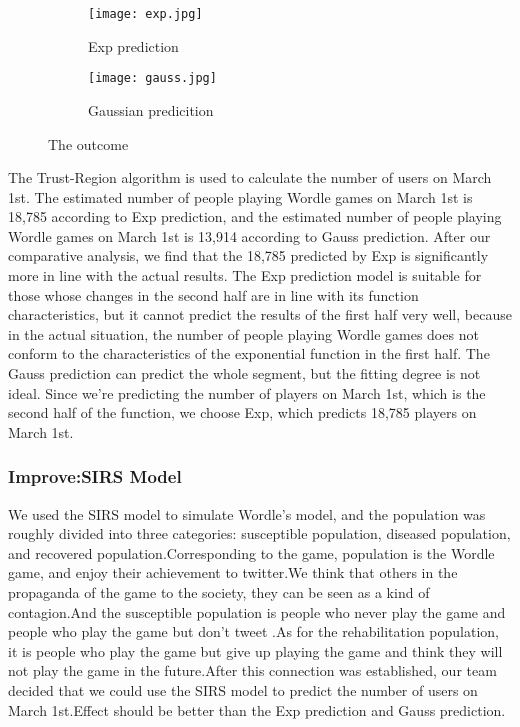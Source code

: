 \documentclass[12pt]{article}  %
\begin{document}
\begin{figure}[htbp]
	
	\begin{subfigure}[b]{.5\textwidth}
		\texttt{[image: exp.jpg]}
		\caption{Exp prediction}\label{subfig:left}
	\end{subfigure}
	\begin{subfigure}[b]{.5\textwidth}
		\texttt{[image: gauss.jpg]}
		\caption{Gaussian predicition}\label{subfig:right}
	\end{subfigure}
	\caption{The outcome }\label{fig:subfigures}
	\end{figure}



The Trust-Region algorithm is used to calculate the number of users on March 1st. The estimated number of people playing Wordle games on March 1st is 18,785 according to Exp prediction, and the estimated number of people playing Wordle games on March 1st is 13,914 according to Gauss prediction. After our comparative analysis, we find that the 18,785 predicted by Exp is significantly more in line with the actual results. The Exp prediction model is suitable for those whose changes in the second half are in line with its function characteristics, but it cannot predict the results of the first half very well, because in the actual situation, the number of people playing Wordle games does not conform to the characteristics of the exponential function in the first half. The Gauss prediction can predict the whole segment, but the fitting degree is not ideal. Since we're predicting the number of players on March 1st, which is the second half of the function, we choose Exp, which predicts 18,785 players on March 1st.\\

\subsubsection{Improve:SIRS Model}
We used the SIRS \cite{1} model to simulate Wordle's model, and the population was roughly divided into three categories: susceptible population, diseased population, and recovered population.Corresponding to the game, population is the Wordle game, and enjoy their achievement to twitter.We think that others in the propaganda of the game to the society, they can be seen as a kind of contagion.And the susceptible population is people who never play the game and people who play the game but don't tweet .As for the rehabilitation population, it is people who play the game but give up playing the game and think they will not play the game in the future.After this connection was established, our team decided that we could use the SIRS model to predict the number of users on March 1st.Effect should be better than the Exp prediction and Gauss prediction.
\end{document}
